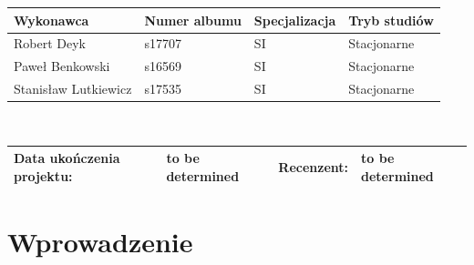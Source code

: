 \documentclass[a4paper,11pt]{report}
\begin{document}
\begin{center}
\begin{tabular}{|l|l|l|l|}
\hline
\textbf{Wykonawca} & \textbf{Numer albumu}& \textbf{Specjalizacja}& \textbf{Tryb studiów} \\
\hline
Robert Deyk&s17707&SI&Stacjonarne \\
\hline
Paweł Benkowski&s16569&SI&Stacjonarne\\
\hline
Stanisław Lutkiewicz&s17535&SI&Stacjonarne \\
\hline
\end{tabular}\\
\vspace{1cm}
\begin{tabular}{|l|l|l|l|}
\hline
\textbf{Data ukończenia projektu:} & to be determined & \textbf{Recenzent:} & to be determined\\
\hline
\end{tabular}
\end{center}
\tableofcontents

\chapter{Wprowadzenie}
\end{document}
